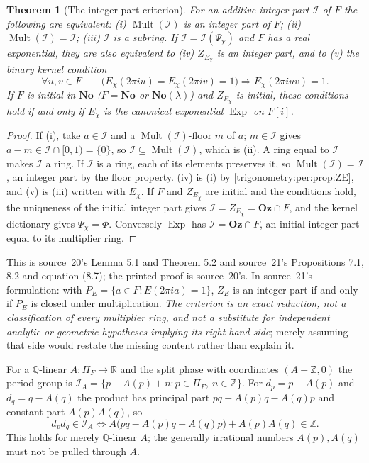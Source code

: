 \documentclass[11pt,letterpaper]{article}
\numberwithin{equation}{section}
\newtheorem{theorem}{Theorem}[section]
\theoremstyle{definition}
\theoremstyle{remark}
\newcommand{\No}{\mathbf{No}}
\newcommand{\Oz}{\mathbf{Oz}}
\newcommand{\R}{\mathbb R}
\newcommand{\Q}{\mathbb Q}
\newcommand{\Z}{\mathbb Z}
\newcommand{\Exp}{\operatorname{Exp}}
\newcommand{\Mult}{\operatorname{Mult}}
\newcommand{\cI}{\mathcal I}
\begin{document}
\begin{theorem}[The integer-part criterion]\label{trigonometry:per:thm:criterion}
For an additive integer part $\cI$ of $F$ the following are equivalent:
(i) $\Mult(\cI)$ is an integer part of $F$; (ii) $\Mult(\cI)=\cI$; (iii) $\cI$ is a subring.
If $\cI=\cI(\Psi_\chi)$ and $F$ has a real exponential, they are also equivalent to (iv) $Z_{E_\chi}$
is an integer part, and to (v) the binary kernel condition
\begin{equation}\label{trigonometry:per:eq:binary}
 \forall u,v\in F\qquad \bigl(E_\chi(2\pi iu)=E_\chi(2\pi iv)=1\bigr)\Longrightarrow E_\chi(2\pi iuv)=1 .
\end{equation}
If $F$ is initial in $\No$ ($F=\No$ or $\No(\lambda)$) and $Z_{E_\chi}$ is initial, these conditions
hold if and only if $E_\chi$ is the canonical exponential $\Exp$ on $F[i]$.
\end{theorem}
\begin{proof}
If (i), take $a\in\cI$ and a $\Mult(\cI)$-floor $m$ of $a$; $m\in\cI$ gives $a-m\in\cI\cap[0,1)=\{0\}$,
so $\cI\subseteq\Mult(\cI)$, which is (ii). A ring equal to $\cI$ makes $\cI$ a ring. If $\cI$ is a ring,
each of its elements preserves it, so $\Mult(\cI)=\cI$, an integer part by the floor property.
(iv) is (i) by \cref{trigonometry:per:prop:ZE}, and (v) is (iii) written with $E_\chi$. If $F$ and
$Z_{E_\chi}$ are initial and the conditions hold, the uniqueness of the initial integer part
\cite[Lemma 11.1]{EK} gives $\cI=Z_{E_\chi}=\Oz\cap F$, and the kernel dictionary gives $\Psi_\chi=\Phi$.
Conversely $\Exp$ has $\cI=\Oz\cap F$, an initial integer part equal to its multiplier ring.
\end{proof}
This is source~20's Lemma 5.1 and Theorem 5.2 and source~21's Propositions 7.1, 8.2 and equation
(8.7); the printed proof is source~20's. In source~21's formulation: with
$P_E=\{a\in F:E(2\pi ia)=1\}$, $Z_E$ is an integer part if and only if $P_E$ is closed under
multiplication. \emph{The criterion is an exact reduction, not a classification of every multiplier
ring, and not a substitute for independent analytic or geometric hypotheses implying its right-hand
side}; merely assuming that side would restate the missing content rather than explain it.

\begin{remark}\label{trigonometry:per:rem:ringdefect}
For a $\Q$-linear $A:\Pi_F\to\R$ and the split phase with coordinates $(A+\Z,0)$ the period group is
$\cI_A=\{p-A(p)+n:p\in\Pi_F,\ n\in\Z\}$. For $d_p=p-A(p)$ and $d_q=q-A(q)$ the product has principal
part $pq-A(p)q-A(q)p$ and constant part $A(p)A(q)$, so
\[
 d_pd_q\in\cI_A\iff A\bigl(pq-A(p)q-A(q)p\bigr)+A(p)A(q)\in\Z .
\]
This holds for merely $\Q$-linear $A$; the generally irrational numbers $A(p),A(q)$ must not be pulled
through $A$.
\end{remark}
\end{document}
